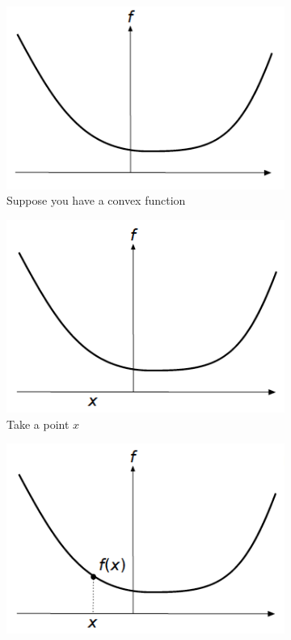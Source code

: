 \begin{figure}
    \centering
    \begin{subfigure}{0.31\textwidth}
    \includegraphics[width=\linewidth]{figures/2/first-order-convex/1.png}
    \caption{Suppose you have a convex function} \label{fig:foc1}
    \end{subfigure}
    \begin{subfigure}{0.31\textwidth}
    \includegraphics[width=\linewidth]{figures/2/first-order-convex/2.png}
    \caption{Take a point $x$} \label{fig:foc2}
    \end{subfigure}
    \begin{subfigure}{0.31\textwidth}
    \includegraphics[width=\linewidth]{figures/2/first-order-convex/3.png}

\end{subfigure}
\end{figure}
